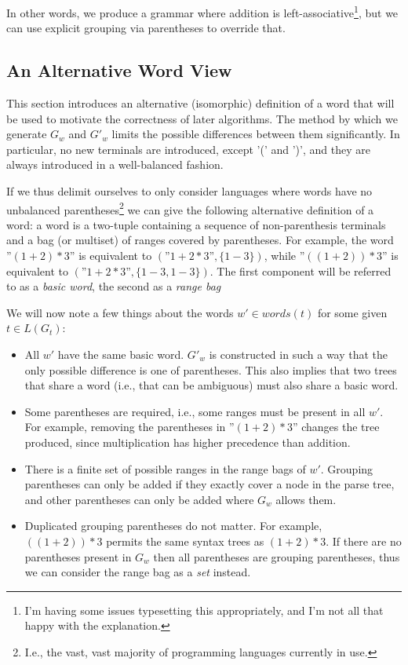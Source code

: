 \documentclass[acmsmall,review,anonymous]{acmart}\settopmatter{printfolios=true,printccs=false,printacmref=false}
\newcommand{\words}{\mathit{words}} %
\newcommand{\range}[2]{#1\!-\!#2}
\begin{document}
\noindent In other words, we produce a grammar where addition is left-associative\footnote{I'm having some issues typesetting this appropriately, and I'm not all that happy with the explanation.}, but we can use explicit grouping via parentheses to override that.

\subsection{An Alternative Word View} \label{sec:word-view}

This section introduces an alternative (isomorphic) definition of a word that will be used to motivate the correctness of later algorithms. The method by which we generate $G_w$ and $G'_w$ limits the possible differences between them significantly. In particular, no new terminals are introduced, except '(' and ')', and they are always introduced in a well-balanced fashion.

If we thus delimit ourselves to only consider languages where words have no unbalanced parentheses\footnote{I.e., the vast, vast majority of programming languages currently in use.} we can give the following alternative definition of a word: a word is a two-tuple containing a sequence of non-parenthesis terminals and a bag (or multiset) of ranges covered by parentheses. For example, the word ''$(1 + 2) * 3$'' is equivalent to $(\text{''}1 + 2 * 3\text{''}, \{\range{1}{3}\})$, while ''$((1 + 2)) * 3$'' is equivalent to $(\text{''}1 + 2 * 3\text{''}, \{\range{1}{3}, \range{1}{3}\})$. The first component will be referred to as a \emph{basic word}, the second as a \emph{range bag}

We will now note a few things about the words $w' \in \words(t)$ for some given $t \in L(G_t)$:

\begin{itemize}
\item All $w'$ have the same basic word. $G'_w$ is constructed in such a way that the only possible difference is one of parentheses. This also implies that two trees that share a word (i.e., that can be ambiguous) must also share a basic word.
\item Some parentheses are required, i.e., some ranges must be present in all $w'$. For example, removing the parentheses in ''$(1 + 2) * 3$'' changes the tree produced, since multiplication has higher precedence than addition.
\item There is a finite set of possible ranges in the range bags of $w'$. Grouping parentheses can only be added if they exactly cover a node in the parse tree, and other parentheses can only be added where $G_w$ allows them.
\item Duplicated grouping parentheses do not matter. For example, $((1 + 2)) * 3$ permits the same syntax trees as $(1 + 2) * 3$. If there are no parentheses present in $G_w$ then all parentheses are grouping parentheses, thus we can consider the range bag as a \emph{set} instead.
\end{itemize}
\end{document}
